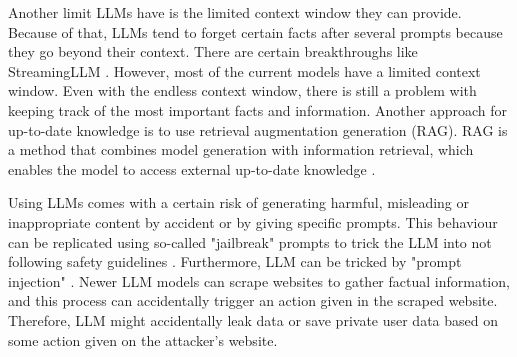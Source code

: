 Another limit LLMs have is the limited context window they can provide. Because of that, LLMs tend to forget certain facts after several prompts because they go beyond their context. There are certain breakthroughs like StreamingLLM \cite{xiao2023efficient}. However, most of the current models have a limited context window. Even with the endless context window, there is still a problem with keeping track of the most important facts and information. Another approach for up-to-date knowledge is to use retrieval augmentation generation (RAG). RAG is a method that combines model generation with information retrieval, which enables the model to access external up-to-date knowledge \cite{rag}.


Using LLMs comes with a certain risk of generating harmful, misleading or inappropriate content by accident or by giving specific prompts. This behaviour can be replicated using so-called "jailbreak" prompts to trick the LLM into not following safety guidelines \cite{jailbreaking}. Furthermore, LLM can be tricked by "prompt injection" \cite{keary_2023}. Newer LLM models can scrape websites to gather factual information, and this process can accidentally trigger an action given in the scraped website. Therefore, LLM might accidentally leak data or save private user data based on some action given on the attacker's website. 







